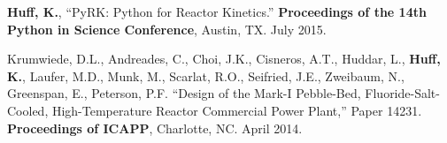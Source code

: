 \documentclass[margin,line]{resume}
\newcommand{\Cyclus}{\textsc{Cyclus}\xspace}%
\begin{document}
\begin{resume}
\begin{bibenum}
      \item \textbf{Huff, K.}, ``PyRK: Python for Reactor Kinetics.''
         \textbf{Proceedings of the 14th Python in Science Conference}, Austin,
         TX. July 2015.
      \item Krumwiede, D.L., Andreades, C., Choi, J.K., Cisneros, A.T., Huddar, L.,
         \textbf{Huff, K.}, Laufer, M.D., Munk, M., Scarlat, R.O., Seifried, J.E.,
         Zweibaum, N., Greenspan, E., Peterson, P.F.  ``Design of the Mark-I
         Pebble-Bed, Fluoride-Salt-Cooled, High-Temperature Reactor Commercial Power
         Plant,'' Paper 14231.  \textbf{Proceedings of ICAPP}, Charlotte, NC. April 2014.
    \end{bibenum}

\end{resume}
\end{document}
